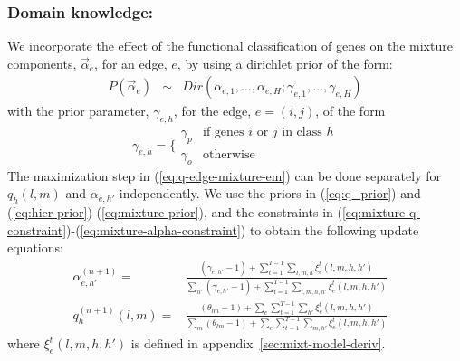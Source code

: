 \documentclass{bioinfo}
\begin{document}
\begin{methods}
\subsubsection{Domain knowledge:}
We incorporate the effect of the functional classification of
genes on the mixture components,
$\vec{\alpha}_e$, for an edge, $e$, by using a dirichlet prior of the form:
\begin{eqnarray}
  \label{eq:hier-prior}
  P(\vec{\alpha}_e) &\sim& Dir(\alpha_{e,1},\ldots, \alpha_{e,H};
  \gamma_{e,1},\ldots, \gamma_{e,H}) 
\end{eqnarray}
with the prior parameter, $\gamma_{e,h}$, for the edge, $e=(i,j)$, of the
form 
\begin{equation}
  \label{eq:mixture-prior}
  \gamma_{e,h} = \Big\{ \begin{array}{ll}
                       \gamma_p & \textrm{if genes }  i \textrm{ or } j
                       \textrm{ in class } h \\
                       \gamma_o & \textrm{otherwise}
                       \end{array}
\end{equation}
The maximization step in (\ref{eq:q-edge-mixture-em}) can  be done
separately for $q_h(l,m)$ and $\alpha_{e,h'}$ independently. We use
the priors in (\ref{eq:q_prior}) and
(\ref{eq:hier-prior})-(\ref{eq:mixture-prior}), and the constraints in
(\ref{eq:mixture-q-constraint})-(\ref{eq:mixture-alpha-constraint}) to
obtain the following update equations:%
\begin{eqnarray}
  \label{eq:mixture-alpha-update}
  \alpha_{e,h'}^{(n+1)} =&  \frac{(\gamma_{e,h'}-1) + \sum_{t=1}^{T-1} \sum_{l,m,h}\xi^{t}_{e}(l,
    m,h,h') }{\sum_{h'} (\gamma_{e,h'} -1) + \sum^{T-1}_{t=1}
    \sum_{l,m,h,h'} \xi^{t}_{e}(l,m,h,h')} & \\
\label{eq:mixture-q-update} 
q^{(n+1)}_h(l,m) =&  \frac{(\theta_{lm}-1) + \sum_e \sum_{t=1}^{T-1}\sum_{h'}\xi^{t}_{e}(l,
    m,h,h') }{\sum_{m} (\theta_{lm} -1) + \sum_e \sum^{T-1}_{t=1}
    \sum_{m,h'} \xi^{t}_{e}(l,m,h,h')} &
\end{eqnarray}
where $\xi^{t}_{e}(l,m,h,h')$ is defined in appendix~\ref{sec:mixt-model-deriv}.


\end{methods}
\end{document}
